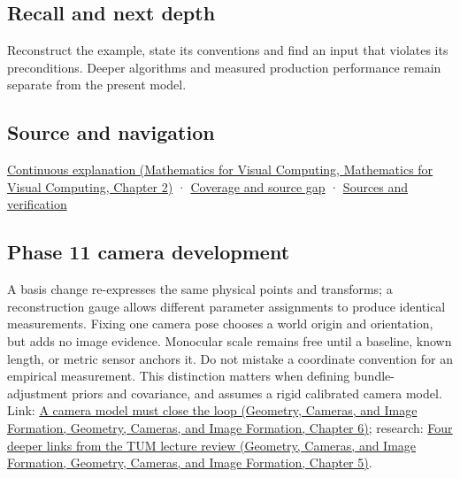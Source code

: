 \subsection{Recall and next depth}\label{appendix-1bae9457dbc3-recall-and-next-depth}

Reconstruct the example, state its conventions and find an input that violates its preconditions. Deeper algorithms and measured production performance remain separate from the present model.

\subsection{Source and navigation}\label{appendix-1bae9457dbc3-source-and-navigation}

\href{../02-Mathematics-for-Visual-Computing/main.pdf\#nameddest=01-foundations-i-ch018-keep-the-promises-visible-while-moving-between-representations}{Continuous explanation (Mathematics for Visual Computing, Mathematics for Visual Computing, Chapter 2)} · \hyperref[appendix-fd090d982a15-phase-7---parts-601-700]{Coverage and source gap} · \hyperref[appendix-a103e7846d21-phase-7---source-analysis-and-verification]{Sources and verification}

\subsection{Phase 11 camera development}\label{appendix-1bae9457dbc3-phase-11-camera-development}

A basis change re-expresses the same physical points and transforms; a reconstruction gauge allows different parameter assignments to produce identical measurements. Fixing one camera pose chooses a world origin and orientation, but adds no image evidence. Monocular scale remains free until a baseline, known length, or metric sensor anchors it. Do not mistake a coordinate convention for an empirical measurement. This distinction matters when defining bundle-adjustment priors and covariance, and assumes a rigid calibrated camera model. Link: \href{../03-Geometry-Cameras-and-Image-Formation/main.pdf\#nameddest=02-foundations-ii-ch037-a-camera-model-must-close-the-loop}{A camera model must close the loop (Geometry, Cameras, and Image Formation, Geometry, Cameras, and Image Formation, Chapter 6)}; research: \href{../03-Geometry-Cameras-and-Image-Formation/main.pdf\#nameddest=02-foundations-ii-ch036-four-deeper-links-from-the-tum-lecture-review}{Four deeper links from the TUM lecture review (Geometry, Cameras, and Image Formation, Geometry, Cameras, and Image Formation, Chapter 5)}.
